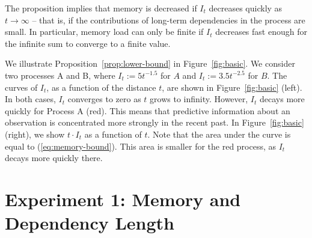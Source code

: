 \documentclass[11pt,letterpaper]{article}
\begin{document}
The proposition implies that memory is decreased if $I_t$ decreases quickly as $t \rightarrow \infty$ -- that is, if the contributions of long-term dependencies in the process are small.
In particular, memory load can only be finite if $I_t$ decreases fast enough for the infinite sum to converge to a finite value.





We illustrate Proposition~\ref{prop:lower-bound} in Figure~\ref{fig:basic}.
We consider two processes A and B, where $I_t := 5t^{-1.5}$ for $A$ and $I_t := 3.5 t^{-2.5}$ for $B$.
The curves of $I_t$, as a function of the distance $t$, are shown in Figure~\ref{fig:basic} (left).
In both cases, $I_t$ converges to zero as $t$ grows to infinity. 
However, $I_t$ decays more quickly for Process A (red).
This means that predictive information about an observation is concentrated more strongly in the recent past.
In Figure~\ref{fig:basic} (right), we show $t\cdot I_t$ as a function of $t$.
Note that the area under the curve is equal to (\ref{eq:memory-bound}).
This area is smaller for the red process, as $I_t$ decays more quickly there.  


\section{Experiment 1: Memory and Dependency Length}



\end{document}
